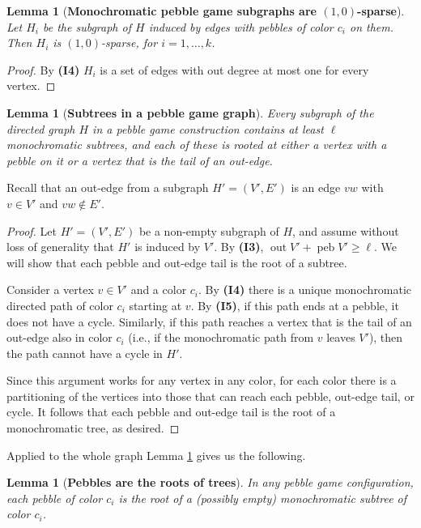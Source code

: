 \documentclass[11pt]{article}
\newtheorem{lemma}[theorem]{Lemma}
\newcommand{\reflem}[1]{Lemma \ref{lem.#1}}
\newcommand{\labellem}[1]{\label{lem.#1}}
\newcommand{\peb}{\ensuremath{\operatorname{peb}}}
\newcommand{\out}{\ensuremath{\operatorname{out}}}
\begin{document}
\begin{lemma}[{\bf Monochromatic pebble game subgraphs are $(1,0)$-sparse}]\labellem{each-color-is-map-sparse}
	Let $H_i$ be the subgraph of $H$ induced by edges with pebbles of color $c_i$ on them. 
	Then $H_i$ is $(1,0)$-sparse, for $i=1,\ldots,k$.  
\end{lemma}
\begin{proof}
	By {\bf (I4)} $H_i$ is a set of edges with out degree at most one for every vertex. 
	
\end{proof}
	
\begin{lemma}[{\bf Subtrees in a pebble game graph}]
\labellem{subtrees}
Every subgraph of the directed graph $H$ in a pebble 
game construction contains at least $\ell$ monochromatic subtrees, 
and each of these is rooted at either a vertex with a pebble on it  
or a vertex that is the tail of an out-edge.
\end{lemma}
Recall that an out-edge from a subgraph $H'=(V',E')$ is an edge $vw$ with $v\in V'$
and $vw\notin E'$.
\begin{proof}
Let $H'=(V',E')$ be a non-empty subgraph of $H$, and assume without loss of generality that $H'$ is 
induced by $V'$.  By {\bf (I3)}, $\out V'+\peb V'\ge \ell$.  We will show that each pebble and 
out-edge tail is the root of a subtree.

Consider a vertex $v\in V'$ and a color $c_i$.  By {\bf (I4)} there is a unique monochromatic 
directed path of color $c_i$ starting at $v$.  By {\bf (I5)}, if this path ends at a pebble,
it does not have a cycle.  Similarly, if this path reaches a vertex that is the tail of an out-edge
also in color $c_i$ (i.e., if the monochromatic path from $v$ leaves $V'$), then the path cannot 
have a cycle in $H'$.

Since this argument works for any vertex in any color, for each color there is a partitioning 
of the vertices into those that can reach each pebble, out-edge tail, or cycle.  It follows
that each pebble and out-edge tail is the root of a monochromatic tree, as desired. 
\end{proof}

Applied to the whole graph \reflem{subtrees} gives us the following.

\begin{lemma}[{\bf Pebbles are the roots of trees}]\labellem{roots}
In any pebble game configuration, each pebble of color $c_i$ is the 
root of a (possibly empty) monochromatic subtree of color $c_i$.
\end{lemma}
\end{document}
